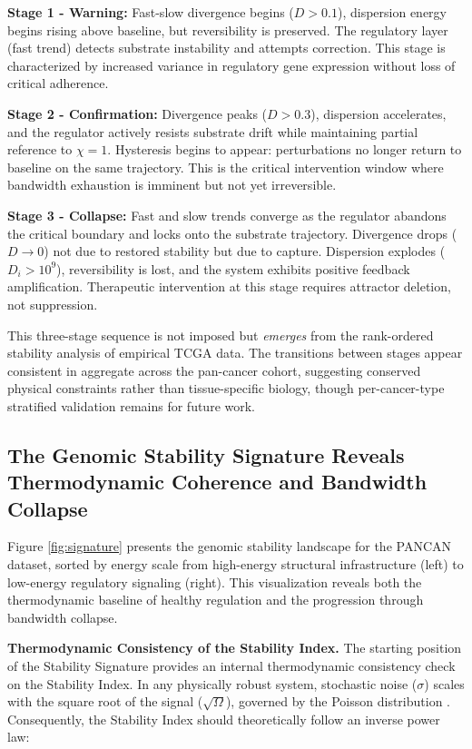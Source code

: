 \documentclass[11pt,letterpaper]{article}
\begin{document}
\textbf{Stage 1 - Warning:} Fast-slow divergence begins ($D > 0.1$), dispersion energy begins rising above baseline, but reversibility is preserved. The regulatory layer (fast trend) detects substrate instability and attempts correction. This stage is characterized by increased variance in regulatory gene expression without loss of critical adherence.

\textbf{Stage 2 - Confirmation:} Divergence peaks ($D > 0.3$), dispersion accelerates, and the regulator actively resists substrate drift while maintaining partial reference to $\chi = 1$. Hysteresis begins to appear: perturbations no longer return to baseline on the same trajectory. This is the critical intervention window where bandwidth exhaustion is imminent but not yet irreversible.

\textbf{Stage 3 - Collapse:} Fast and slow trends converge as the regulator abandons the critical boundary and locks onto the substrate trajectory. Divergence drops ($D \to 0$) not due to restored stability but due to capture. Dispersion explodes ($D_i > 10^9$), reversibility is lost, and the system exhibits positive feedback amplification. Therapeutic intervention at this stage requires attractor deletion, not suppression.

This three-stage sequence is not imposed but \textit{emerges} from the rank-ordered stability analysis of empirical TCGA data. The transitions between stages appear consistent in aggregate across the pan-cancer cohort, suggesting conserved physical constraints rather than tissue-specific biology, though per-cancer-type stratified validation remains for future work.

\subsection{The Genomic Stability Signature Reveals Thermodynamic Coherence and Bandwidth Collapse}

Figure \ref{fig:signature} presents the genomic stability landscape for the PANCAN dataset, sorted by energy scale from high-energy structural infrastructure (left) to low-energy regulatory signaling (right). This visualization reveals both the thermodynamic baseline of healthy regulation and the progression through bandwidth collapse.

\textbf{Thermodynamic Consistency of the Stability Index.} The starting position of the Stability Signature provides an internal thermodynamic consistency check on the Stability Index. In any physically robust system, stochastic noise ($\sigma$) scales with the square root of the signal ($\sqrt{\Omega}$), governed by the Poisson distribution \cite{Paulsson2004}. Consequently, the Stability Index should theoretically follow an inverse power law:
\end{document}
